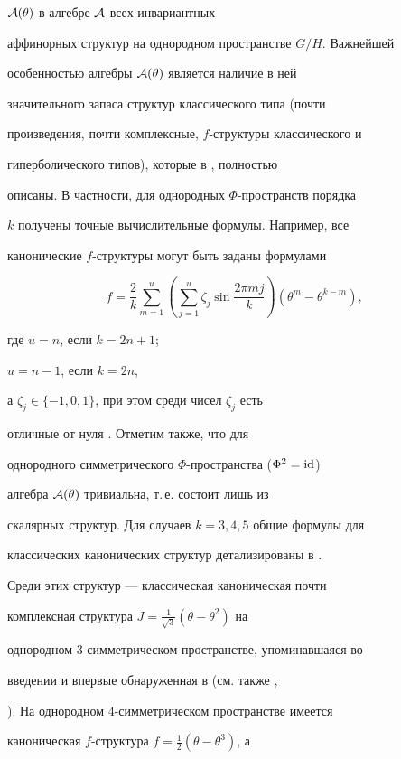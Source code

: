 $\cal{A}(\theta)$ в алгебре $\cal{A}$ всех инвариантных


аффинорных структур на однородном пространстве $G/H$. Важнейшей


особенностью алгебры $\cal{A}(\theta)$ является наличие в ней


значительного запаса структур классического типа (почти


произведения, почти комплексные, $f$-структуры классического и


гиперболического типов), которые в \cite{13}, \cite{14} полностью


описаны. В частности, для однородных $\Phi$-пространств порядка


$k$ получены точные вычислительные формулы. Например, все


канонические $f$-структуры могут быть заданы формулами


\begin{equation}\label{fstr1}


f=\frac2k\sum_{m=1}^u\left(\sum_{j=1}^u \zeta_j \sin{\frac{2\pi m


j}{k}}\right)(\theta^m-\theta^{k-m}),


\end{equation}


где $u=n$, если $k=2n+1$;


$u=n-1$, если $k=2n$,


а $\zeta_j\in\{-1,0,1\}$, при этом среди чисел $\zeta_j$ есть


отличные от нуля \cite{13}. Отметим также, что для


однородного симметрического $\Phi$-пространства ($\Phi^{2}=\operatorname{id}$)


алгебра $\cal{A}(\theta)$ тривиальна, т.\,е. состоит лишь из


скалярных структур. Для случаев $k=3,4,5$ общие формулы для


классических канонических структур детализированы в \cite{13}.


Среди этих структур --- классическая каноническая почти


комплексная структура $J=\frac{1}{\sqrt{3}}(\theta-\theta^2)$ на


однородном $3$-симметрическом пространстве, упоминавшаяся во


введении и впервые обнаруженная в \cite{5} (см. также \cite{6},


\cite{7}). На однородном $4$-симметрическом пространстве имеется


каноническая $f$-структура $f=\frac{1}{2}(\theta-\theta^{3})$, а



